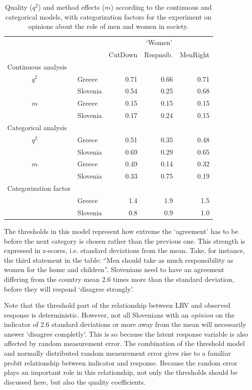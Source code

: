\documentclass[a4paper,12pt]{article}
\begin{document}
\begin{table}\centering\begin{footnotesize}\caption{Quality ($q^2$) and method effects ($m$) according to the continuous and categorical models, with categorization factors for the experiment on opinions about the role of men and women in society.\label{tab:women}}\begin{tabular}{lllrrr}
\hline
 &  &  & \multicolumn{3}{c}{`Women'} \\
 &  &  & CutDown & Respnsib. & MenRight\\
\hline
\multicolumn{2}{l}{Continuous analysis}\\		   
 & $q^2$ & Greece & 0.71 & 0.66 & 0.71\\
 &  & Slovenia & 0.54 & 0.25 & 0.68\\
& $m$ & Greece & 0.15 & 0.15 & 0.15\\
&  & Slovenia & 0.17 & 0.24 & 0.15\\
\multicolumn{2}{l}{Categorical analysis}   &  &  &  & \\
 & $q^2$ & Greece & 0.51 & 0.35 & 0.48\\
 &  & Slovenia & 0.69 & 0.29 & 0.65\\
& $m$ & Greece & 0.49 & 0.14 & 0.32\\
&  & Slovenia & 0.33 & 0.75 & 0.19\\
 \multicolumn{2}{l}{Categorization factor}   &  &  &  & \\
 &  & Greece & 1.4 & 1.9 & 1.5\\
 &  & Slovenia & 0.8 & 0.9 & 1.0\\
\hline
\end{tabular}\end{footnotesize}\end{table}

The thresholds in this model represent how extreme the `agreement' has to be before the next category is chosen rather than the previous one. This strength is expressed in z-scores, i.e. standard deviations from the mean. Take, for instance, the third statement in the table: ``Men should take as much responsibility as women for the home and children''.  Slovenians need to have an agreement differing from the country mean 2.6 times more than the standard deviation, before they will respond `disagree strongly'. 


Note that the threshold part of the relationship between LRV and observed response is deterministic. However, not all Slovenians with an \emph{opinion} on the indicator of 2.6 standard deviations or more away from the mean will necessarily answer `disagree completly'.  This is so because the latent response variable is also affected by random measurement error. The combination of the threshold model and normally distributed random measurement error gives rise to a familiar probit relationship between indicator and response. Because the random error plays an important role in this relationship, not only the thresholds should be discussed here, but also the quality coefficients. 
\end{document}
